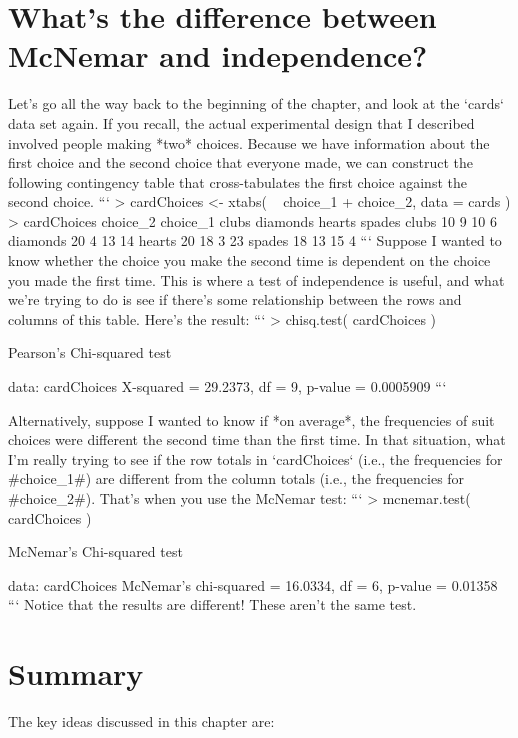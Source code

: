 \section{What's the difference between McNemar and independence?}

Let's go all the way back to the beginning of the chapter, and look at the `cards` data set again. If you recall, the actual experimental design that I described involved people making *two* choices. Because we have information about the first choice and the second choice that everyone made, we can construct the following contingency table that cross-tabulates the first choice against the second choice.
```
> cardChoices <- xtabs( ~ choice_1 + choice_2, data = cards )
> cardChoices
          choice_2
choice_1   clubs diamonds hearts spades
  clubs       10        9     10      6
  diamonds    20        4     13     14
  hearts      20       18      3     23
  spades      18       13     15      4
```
Suppose I wanted to know whether the choice you make the second time is dependent on the choice you made the first time. This is where a test of independence is useful, and what we're trying to do is see if there's some relationship between the rows and columns of this table. Here's the result:
```
> chisq.test( cardChoices )

	Pearson's Chi-squared test

data:  cardChoices
X-squared = 29.2373, df = 9, p-value = 0.0005909
```

Alternatively, suppose I wanted to know if *on average*, the frequencies of suit choices were different the second time than the first time. In that situation, what I'm really trying to see if the row totals in `cardChoices` (i.e., the frequencies for \rtextverb#choice_1#) are different from the column totals (i.e., the frequencies for \rtextverb#choice_2#). That's when you use the McNemar test:
```
> mcnemar.test( cardChoices )

	McNemar's Chi-squared test

data:  cardChoices
McNemar's chi-squared = 16.0334, df = 6, p-value = 0.01358
```
Notice that the results are different! These aren't the same test. 



\section{Summary}

The key ideas discussed in this chapter are:


